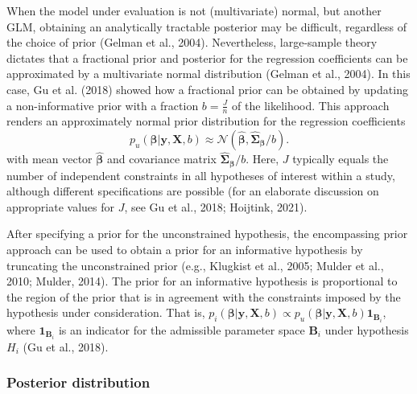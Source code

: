 \documentclass[
]{interact}
\begin{document}
When the model under evaluation is not (multivariate) normal, but
another GLM, obtaining an analytically tractable posterior may be
difficult, regardless of the choice of prior (Gelman et al., 2004).
Nevertheless, large-sample theory dictates that a fractional prior and
posterior for the regression coefficients can be approximated by a
multivariate normal distribution (Gelman et al., 2004). In this case, Gu
et al. (2018) showed how a fractional prior can be obtained by updating
a non-informative prior with a fraction \(b = \frac{J}{n}\) of the
likelihood. This approach renders an approximately normal prior
distribution for the regression coefficients \[
p_u(\boldsymbol{\beta} | \boldsymbol{y}, \boldsymbol{X}, b) \approx 
\mathcal{N}(\boldsymbol{\hat{\beta}}, \boldsymbol{\hat{\Sigma}_\beta} / b).
\] with mean vector \(\boldsymbol{\hat{\beta}}\) and covariance matrix
\(\boldsymbol{\hat{\Sigma}_{\beta}}/b\). Here, \(J\) typically equals
the number of independent constraints in all hypotheses of interest
within a study, although different specifications are possible (for an
elaborate discussion on appropriate values for \(J\), see Gu et al.,
2018; Hoijtink, 2021).

After specifying a prior for the unconstrained hypothesis, the
encompassing prior approach can be used to obtain a prior for an
informative hypothesis by truncating the unconstrained prior (e.g.,
Klugkist et al., 2005; Mulder et al., 2010; Mulder, 2014). The prior for
an informative hypothesis is proportional to the region of the prior
that is in agreement with the constraints imposed by the hypothesis
under consideration. That is,
\(p_i(\boldsymbol{\beta} | \boldsymbol{y}, \boldsymbol{X}, b) \propto p_u(\boldsymbol{\beta} | \boldsymbol{y}, \boldsymbol{X}, b)\boldsymbol{1}_{\boldsymbol{B}_i}\),
where \(\boldsymbol{1}_{\boldsymbol{B}_i}\) is an indicator for the
admissible parameter space \(\boldsymbol{B}_i\) under hypothesis \(H_i\)
(Gu et al., 2018).

\hypertarget{posterior-distribution}{%
\subsubsection{Posterior distribution}\label{posterior-distribution}}
\end{document}
